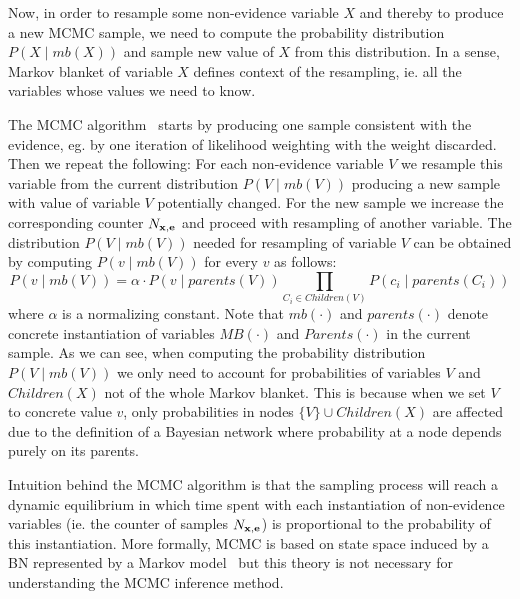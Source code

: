 \documentclass[english,cover]{fitthesis} %
\newcommand{\vars}[1]{{\bold{#1}}}         %
\newcommand{\note}[1]{{\color{green}#1}}
\begin{document}
Now, in order to resample some non-evidence variable $X$ and thereby to produce a new MCMC sample, we need to compute the probability distribution $P(X \mid mb(X))$ and sample new value of $X$ from this distribution. In a sense, Markov blanket of variable $X$ defines context of the resampling, ie. all the variables whose values we need to know.

The MCMC algorithm~\cite[p.~516]{russell_norvig_ed2} starts by producing one sample consistent with the evidence, eg. by one iteration of likelihood weighting with the weight discarded. Then we repeat the following: For each non-evidence variable $V$ we resample this variable from the current distribution $P(V \mid mb(V))$ producing a new sample with value of variable $V$ potentially changed. For the new sample we increase the corresponding counter $N_{\vars{x},\vars{e}}$ and proceed with resampling of another variable. The distribution $P(V \mid mb(V))$ needed for resampling of variable $V$ can be obtained by computing $P(v \mid mb(V))$ for every $v$ as follows:
\begin{equation*}
    P(v \mid mb(V)) = \alpha \cdot P(v \mid parents(V)) \!\!\!\!\!\!\!\! \prod_{C_i \in Children(V)} \!\!\!\!\!\!\!\!\!\!\!\! P(c_i \mid parents(C_i))
\end{equation*}
where $\alpha$ is a normalizing constant. Note that $mb(\cdot)$ and $parents(\cdot)$ denote concrete instantiation of variables $MB(\cdot)$ and $Parents(\cdot)$ in the current sample. As we can see, when computing the probability distribution $P(V \mid mb(V))$ we only need to account for probabilities of variables $V$ and $Children(X)$ not of the whole Markov blanket. This is because when we set $V$ to concrete value $v$, only probabilities in nodes $\lbrace V \rbrace \cup Children(X)$ are affected due to the definition of a Bayesian network where probability at a node depends purely on its parents.

Intuition behind the MCMC algorithm is that the sampling process will reach a dynamic equilibrium in which time spent with each instantiation of non-evidence variables (ie. the counter of samples $N_{\vars{x},\vars{e}}$) is proportional to the probability of this instantiation. More formally, MCMC is based on state space induced by a BN represented by a Markov model~\cite[p.~516]{russell_norvig_ed2} but this theory is not necessary for understanding the MCMC inference method.

\end{document}
